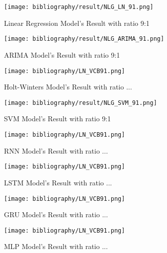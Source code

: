 \documentclass{ieeeojies}
\begin{document}
	\begin{figure}[H]
		\centering
		\begin{minipage}{0.9\linewidth}
			\centering
			\texttt{[image: bibliography/result/NLG\_LN\_91.png]}
			\caption{Linear Regression Model's Result with ratio 9:1}
			\label{fig3.1}
		\end{minipage}
	\end{figure}
	\begin{figure}[H]
		\centering
		\begin{minipage}{0.9\linewidth}
			\centering
			\texttt{[image: bibliography/result/NLG\_ARIMA\_91.png]}
			\caption{ARIMA Model's Result with ratio 9:1}
			\label{fig3.2}
		\end{minipage}
	\end{figure}
	\begin{figure}[H]
		\centering
		\begin{minipage}{0.9\linewidth}
			\centering
			\texttt{[image: bibliography/LN\_VCB91.png]}
			\caption{Holt-Winters Model's Result with ratio ...}
			\label{fig3.3}
		\end{minipage}
	\end{figure}
	\begin{figure}[H]
		\centering
		\begin{minipage}{0.9\linewidth}
			\centering
			\texttt{[image: bibliography/result/NLG\_SVM\_91.png]}
			\caption{SVM Model's Result with ratio 9:1}
			\label{fig3.4}
		\end{minipage}
	\end{figure}
	\begin{figure}[H]
		\centering
		\begin{minipage}{0.9\linewidth}
			\centering
			\texttt{[image: bibliography/LN\_VCB91.png]}
			\caption{RNN Model's Result with ratio ...}
			\label{fig3.5}
		\end{minipage}
	\end{figure}
	\begin{figure}[H]
		\centering
		\begin{minipage}{0.9\linewidth}
			\centering
			\texttt{[image: bibliography/LN\_VCB91.png]}
			\caption{LSTM Model's Result with ratio ...}
			\label{fig3.6}
		\end{minipage}
	\end{figure}
	\begin{figure}[H]
		\centering
		\begin{minipage}{0.9\linewidth}
			\centering
			\texttt{[image: bibliography/LN\_VCB91.png]}
			\caption{GRU Model's Result with ratio ...}
			\label{fig3.7}
		\end{minipage}
	\end{figure}
	\begin{figure}[H]
		\centering
		\begin{minipage}{0.9\linewidth}
			\centering
			\texttt{[image: bibliography/LN\_VCB91.png]}
			\caption{MLP Model's Result with ratio ...}
			\label{fig3.8}
		\end{minipage}
	\end{figure}
	
\end{document}
